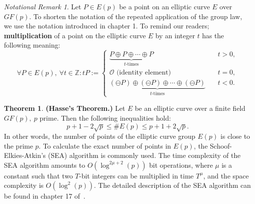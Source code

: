 \documentclass[thesis=M,english]{FITthesis}[2012/10/20]
\theoremstyle{remark}
\newtheorem*{NRM}{Notational Remark}
\theoremstyle{definition}
\newtheorem{theorem}{Theorem}[section]
\begin{document}
\begin{NRM}
Let $P \in E(p)$ be a point on an elliptic curve $E$ over $GF(p)$. To shorten the notation of the repeated application of the group law, we use the notation introduced in chapter 1. To remind our readers; \textbf{multiplication} of a point on the elliptic curve $E$ by an integer $t$ has the following meaning:
$$
\forall P \in E(p),\ \forall t \in \mathbb{Z}: tP := \begin{cases} \underbrace{P \oplus P \oplus \cdots \oplus P}_{\text{$t$-times}} &\quad t > 0, \\
\mathcal{O} \text{ (identity element) } &\quad t = 0, \\
\underbrace{(\ominus P) \oplus (\ominus P) \oplus \cdots \oplus (\ominus P)}_{\text{$t$-times}} &\quad t < 0.
\end{cases}
$$
\end{NRM}
\begin{theorem}\textbf{(Hasse's Theorem.)} \label{hase}Let $E$ be an elliptic curve over a finite field $GF(p),\ p$ prime. Then the following inequalities hold:
$$
p + 1 -2\sqrt{p} \leq \#E(p) \leq p + 1 + 2\sqrt{p}.
$$
In other words, the number of points of the elliptic curve group $E(p)$ is close to the prime $p$. To calculate the exact number of points in $E(p)$, the Schoof-Elkies-Atkin's (SEA) algorithm is commonly used. The time complexity of the SEA algorithm amounts to $O(\log^{2\mu + 2}(p))$ bit operations, where $\mu$ is a constant such that two $T$-bit integers can be multiplied in time $T^\mu$, and the space complexity is $O(\log^2(p)).$ The detailed description of the SEA algorithm can be found in chapter 17 of~\cite{handbook}. 
\end{theorem}
\end{document}
